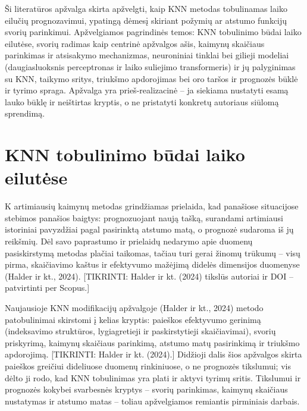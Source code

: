 \documentclass[]{VUMIFTemplateClass}
\begin{document}
    Ši literatūros apžvalga skirta apžvelgti, kaip KNN metodas tobulinamas laiko eilučių prognozavimui, ypatingą dėmesį skiriant požymių ar atstumo funkcijų svorių parinkimui. Apžvelgiamos pagrindinės temos: KNN tobulinimo būdai laiko eilutėse, svorių radimas kaip centrinė apžvalgos ašis, kaimynų skaičiaus parinkimas ir atsisakymo mechanizmas, neuroniniai tinklai bei gilieji modeliai (daugiasluoksnis perceptronas ir laiko suliejimo transformeris) ir jų palyginimas su KNN, taikymo sritys, triukšmo apdorojimas bei oro taršos ir  prognozės būklė ir tyrimo spraga. Apžvalga yra prieš-realizacinė -- ja siekiama nustatyti esamą lauko būklę ir neištirtas kryptis, o ne pristatyti konkretų autoriaus siūlomą sprendimą.


    \section{KNN tobulinimo būdai laiko eilutėse}

    K artimiausių kaimynų metodas grindžiamas prielaida, kad panašiose situacijose stebimos panašios baigtys: prognozuojant naują tašką, surandami artimiausi istoriniai pavyzdžiai pagal pasirinktą atstumo matą, o prognozė sudaroma iš jų reikšmių. Dėl savo paprastumo ir prielaidų nedarymo apie duomenų pasiskirstymą metodas plačiai taikomas, tačiau turi gerai žinomų trūkumų -- visų pirma, skaičiavimo kaštus ir efektyvumo mažėjimą didelės dimensijos duomenyse (Halder ir kt., 2024). [TIKRINTI: Halder ir kt. (2024) tikslūs autoriai ir DOI -- patvirtinti per Scopus.]

    Naujausioje KNN modifikacijų apžvalgoje (Halder ir kt., 2024) metodo patobulinimai skirstomi į kelias kryptis: paieškos efektyvumo gerinimą (indeksavimo struktūros, lygiagretieji ir paskirstytieji skaičiavimai), svorių priskyrimą, kaimynų skaičiaus parinkimą, atstumo matų pasirinkimą ir triukšmo apdorojimą. [TIKRINTI: Halder ir kt. (2024).] Didžioji dalis šios apžvalgos skirta paieškos greičiui dideliuose duomenų rinkiniuose, o ne prognozės tikslumui; vis dėlto ji rodo, kad KNN tobulinimas yra plati ir aktyvi tyrimų sritis. Tikslumui ir prognozės kokybei svarbesnės kryptys -- svorių parinkimas, kaimynų skaičiaus nustatymas ir atstumo matas -- toliau apžvelgiamos remiantis pirminiais darbais.
\end{document}

